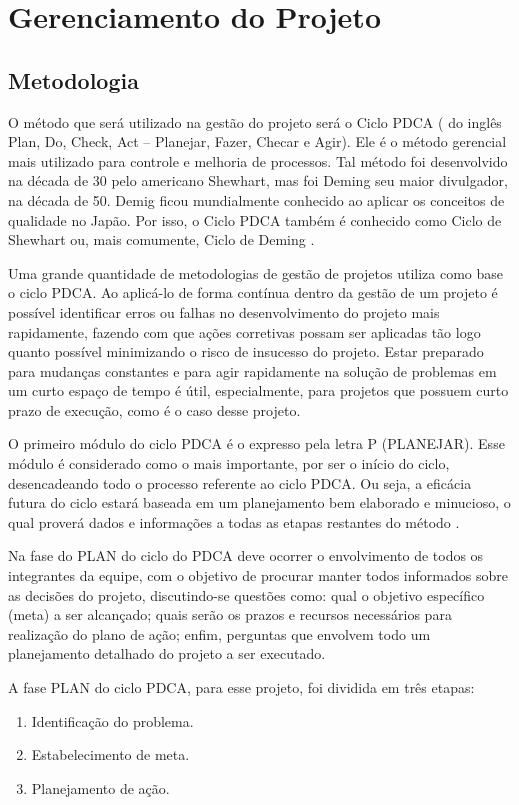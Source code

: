 \chapter[Gerenciamento do Projeto]{Gerenciamento do Projeto}

\section[Metodologia]{Metodologia}

O método que será utilizado na gestão do projeto será o Ciclo PDCA ( do inglês Plan, Do, Check, Act – Planejar, Fazer, Checar e Agir). Ele é o método gerencial mais utilizado para controle e melhoria de processos. Tal método foi desenvolvido na década de 30 pelo americano Shewhart, mas foi Deming seu maior divulgador, na década de 50. Demig ficou mundialmente conhecido ao aplicar os conceitos de qualidade no Japão. Por isso, o Ciclo PDCA também é conhecido como Ciclo de Shewhart ou, mais comumente, Ciclo de Deming \cite{pdca3}. 

Uma grande quantidade de metodologias de gestão de projetos utiliza como base o ciclo PDCA. Ao aplicá-lo de forma contínua dentro da gestão de um projeto é possível identificar erros ou falhas no desenvolvimento do projeto mais rapidamente, fazendo com que ações corretivas possam ser aplicadas tão logo quanto possível minimizando o risco de insucesso do projeto. Estar preparado para mudanças constantes e para agir rapidamente na solução de problemas em um curto espaço de tempo é útil, especialmente, para projetos que possuem curto prazo de execução, como é o caso desse projeto. 

O primeiro módulo do ciclo PDCA é o expresso pela letra P (PLANEJAR). Esse módulo é considerado como o mais importante, por ser o início do ciclo, desencadeando todo o processo referente ao ciclo PDCA. Ou seja, a eficácia futura do ciclo estará baseada em um planejamento bem elaborado e minucioso, o qual proverá dados e informações a todas as etapas restantes do método \cite{pdca1}.

Na fase do PLAN do ciclo do PDCA deve ocorrer o envolvimento de todos os integrantes da equipe, com o objetivo de procurar manter todos informados sobre as decisões do projeto, discutindo-se questões como: qual o objetivo específico (meta) a ser alcançado; quais serão os prazos e recursos necessários para realização do plano de ação; enfim, perguntas que envolvem todo um planejamento detalhado do projeto a ser executado.

A fase PLAN do ciclo PDCA, para esse projeto, foi dividida em três etapas:
\begin{enumerate}
\item Identificação do problema.
\item Estabelecimento de meta.
\item Planejamento de ação.
\end{enumerate}

